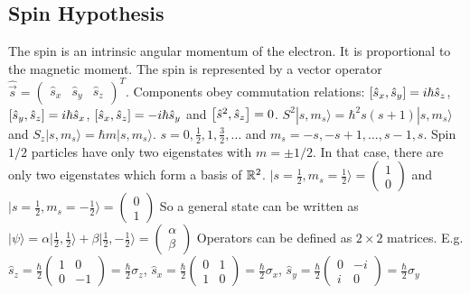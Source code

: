 \subsection{Spin Hypothesis}
The spin is an intrinsic angular momentum of the electron. It is proportional
to the magnetic moment. The spin is represented by a vector operator
$\hat{\vec{s}} = \begin{pmatrix} \hat{s}_x & \hat{s}_y & \hat{s}_z \end{pmatrix}^T$.
Components obey commutation relations: $\left[ \hat{s}_x , \hat{s}_y \right] = i \hbar \hat{s}_z$,
$\left[ \hat{s}_y , \hat{s}_z \right] = i \hbar \hat{s}_x$,
$\left[ \hat{s}_x , \hat{s}_z \right] = - i \hbar \hat{s}_y$ and
$\left[ \hat{s}^2 , \hat{s}_z \right] = 0$.
$S^2 |s,m_s \rangle = \hbar^2 s(s+1) |s,m_s \rangle$ and
$S_z |s,m_s \rangle = \hbar m |s,m_s \rangle$.
$s = 0,\frac{1}{2},1,\frac{3}{2},\dots$ and $m_s = -s,-s+1,\dots,s-1,s$.
Spin $1/2$ particles have only two eigenstates with $m = \pm 1/2$.
In that case, there are only two eigenstates which form a basis of $\mathbb{R}^2$.
$|s=\frac{1}{2},m_s = \frac{1}{2} \rangle = \begin{pmatrix}
    1 \\ 0
\end{pmatrix}$ and $|s=\frac{1}{2},m_s = - \frac{1}{2} \rangle = \begin{pmatrix}
    0 \\ 1
\end{pmatrix}$
So a general state can be written as
$| \psi \rangle = \alpha |\frac{1}{2},\frac{1}{2} \rangle + \beta |\frac{1}{2},-\frac{1}{2} \rangle
= \begin{pmatrix}
    \alpha \\ \beta
\end{pmatrix}$
Operators can be defined as $2 \times 2$ matrices. E.g. $\hat{s}_z = \frac{\hbar}{2}
\begin{pmatrix}
    1 & 0 \\ 0 & -1
\end{pmatrix} = \frac{\hbar}{2} \sigma_z$,
$\hat{s}_x = \frac{\hbar}{2} \begin{pmatrix}
    0 & 1 \\ 1 & 0
\end{pmatrix} = \frac{\hbar}{2} \sigma_x$,
$\hat{s}_y = \frac{\hbar}{2} \begin{pmatrix}
    0 & -i \\ i & 0
\end{pmatrix} = \frac{\hbar}{2} \sigma_y$

